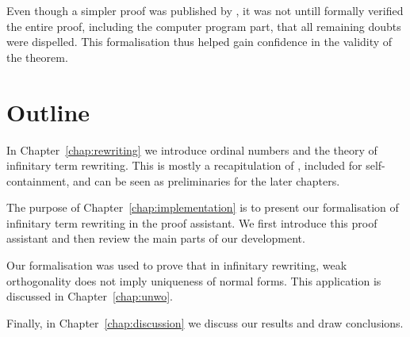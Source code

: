 Even though a simpler proof was published by \citet{robertson-97}, it
was not untill \citet{gonthier-05} formally verified the entire proof,
including the computer program part, that all remaining doubts were
dispelled. This formalisation thus helped gain confidence in the
validity of the theorem.


\section*{Outline}

In Chapter~\ref{chap:rewriting} we introduce ordinal numbers and the
theory of infinitary term rewriting. This is mostly a recapitulation
of \citet{terese-03}, included for self-containment, and can be seen
as preliminaries for the later chapters.

The purpose of Chapter~\ref{chap:implementation} is to present our
formalisation of infinitary term rewriting in the \Coq proof
assistant. We first introduce this proof assistant and then review the
main parts of our development.

Our formalisation was used to prove that in infinitary rewriting, weak
orthogonality does not imply uniqueness of normal forms. This
application is discussed in Chapter~\ref{chap:unwo}.

Finally, in Chapter~\ref{chap:discussion} we discuss our results and
draw conclusions.
